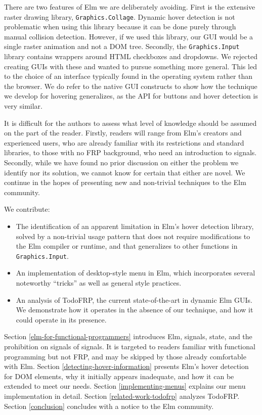\documentclass{article}
\begin{document}
There are two features of Elm we are deliberately avoiding. First is the
extensive raster drawing library, \texttt{Graphics.Collage}. Dynamic hover
detection is not problematic when using this library because it can be done
purely through manual collision detection. However, if we used this library, our
GUI would be a single raster animation and not a DOM tree. Secondly, the
\texttt{Graphics.Input} library contains wrappers around HTML checkboxes and
dropdowns. We rejected creating GUIs with these and wanted to pursue something
more general. This led to the choice of an interface typically found in the
operating system rather than the browser. We do refer to the native GUI
constructs to show how the technique we develop for hovering generalizes, as the
API for buttons and hover detection is very similar.

It is difficult for the authors to assess what level of knowledge should
be assumed on the part of the reader. Firstly, readers will range from
Elm's creators and experienced users, who are already familiar with its
restrictions and standard libraries, to those with no FRP background,
who need an introduction to signals. Secondly, while we have found no
prior discussion on either the problem we identify nor its solution, we
cannot know for certain that either are novel. We continue in the hopes
of presenting new and non-trivial techniques to the Elm community.

We contribute:

\begin{itemize}
\itemsep1pt\parskip0pt
\item
  The identification of an apparent limitation in Elm's hover detection
  library, solved by a non-trivial usage pattern that does not require
  modifications to the Elm compiler or runtime, and that generalizes to
  other functions in \texttt{Graphics.Input}.
\item
  An implementation of desktop-style menu in Elm, which incorporates
  several noteworthy ``tricks'' as well as general style practices.
\item
  An analysis of TodoFRP, the current state-of-the-art in dynamic Elm
  GUIs. We demonstrate how it operates in the absence of our technique,
  and how it could operate in its presence.
\end{itemize}

Section \ref{elm-for-functional-programmers} introduces Elm, signals, state, and
the prohibition on signals of signals. It is targeted to readers familiar with
functional programming but not FRP, and may be skipped by those already
comfortable with Elm.
Section \ref{detecting-hover-information} presents Elm's hover detection for DOM
elements, why it initially appears inadequate, and how it can be extended to
meet our needs.
Section \ref{implementing-menus} explains our menu implementation in detail.
Section \ref{related-work-todofrp} analyzes TodoFRP.
Section \ref{conclusion} concludes with a notice to the Elm community.
\end{document}
